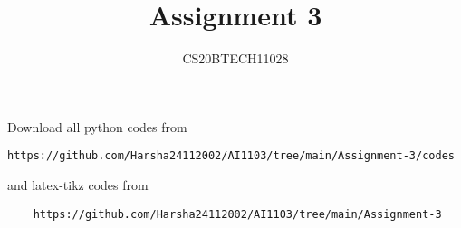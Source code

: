 \documentclass[journal,12pt,twocolumn]{IEEEtran}
\DeclareMathOperator*{\Res}{Res}
\begin{document}
\newcommand{\BEQA}{\begin{eqnarray}}
\newcommand{\EEQA}{\end{eqnarray}}
\newcommand{\define}{\stackrel{\triangle}{=}}

\raggedbottom
\setlength{\parindent}{0pt}
\providecommand{\mbf}{\mathbf}
\providecommand{\pr}[1]{\ensuremath{\Pr\left(#1\right)}}
\providecommand{\qfunc}[1]{\ensuremath{Q\left(#1\right)}}
\providecommand{\sbrak}[1]{\ensuremath{{}\left[#1\right]}}
\providecommand{\lsbrak}[1]{\ensuremath{{}\left[#1\right.}}
\providecommand{\rsbrak}[1]{\ensuremath{{}\left.#1\right]}}
\providecommand{\brak}[1]{\ensuremath{\left(#1\right)}}
\providecommand{\lbrak}[1]{\ensuremath{\left(#1\right.}}
\providecommand{\rbrak}[1]{\ensuremath{\left.#1\right)}}
\providecommand{\cbrak}[1]{\ensuremath{\left\{#1\right\}}}
\providecommand{\lcbrak}[1]{\ensuremath{\left\{#1\right.}}
\providecommand{\rcbrak}[1]{\ensuremath{\left.#1\right\}}}
\theoremstyle{remark}
\newtheorem{rem}{Remark}
\newcommand{\sgn}{\mathop{\mathrm{sgn}}}
\providecommand{\abs}[1]{\vert#1\vert}
\providecommand{\res}[1]{\Res\displaylimits_{#1}} 
\providecommand{\norm}[1]{\lVert#1\rVert}
\providecommand{\mtx}[1]{\mathbf{#1}}
\providecommand{\mean}[1]{E[ #1 ]}
\providecommand{\fourier}{\overset{\mathcal{F}}{ \rightleftharpoons}}
\providecommand{\system}{\overset{\mathcal{H}}{ \longleftrightarrow}}
\newcommand{\solution}{\noindent \textbf{Solution: }}
\newcommand{\cosec}{\,\text{cosec}\,}
\providecommand{\dec}[2]{\ensuremath{\overset{#1}{\underset{#2}{\gtrless}}}}
\newcommand{\myvec}[1]{\ensuremath{\begin{pmatrix}#1\end{pmatrix}}}
\newcommand{\mydet}[1]{\ensuremath{\begin{vmatrix}#1\end{vmatrix}}}
\makeatletter
{}
\makeatother
\let\StandardTheFigure\thefigure
\let\vec\mathbf
\renewcommand{\thefigure}{\theproblem}
\def\putbox#1#2#3{\makebox[0in][l]{\makebox[#1][l]{}\raisebox{\baselineskip}[0in][0in]{\raisebox{#2}[0in][0in]{#3}}}}
     \def\rightbox#1{\makebox[0in][r]{#1}}
     \def\centbox#1{\makebox[0in]{#1}}
     \def\topbox#1{\raisebox{-\baselineskip}[0in][0in]{#1}}
     \def\midbox#1{\raisebox{-0.5\baselineskip}[0in][0in]{#1}}
\vspace{3cm}
\title{Assignment 3}
\author{CS20BTECH11028}
\maketitle
\newpage
\bigskip
\renewcommand{\thefigure}{\theenumi}
\renewcommand{\thetable}{\theenumi}
Download all python codes from 
\begin{lstlisting}
https://github.com/Harsha24112002/AI1103/tree/main/Assignment-3/codes
\end{lstlisting}
%
and latex-tikz codes from 
%
\begin{lstlisting}
    https://github.com/Harsha24112002/AI1103/tree/main/Assignment-3
\end{lstlisting}
\end{document}

